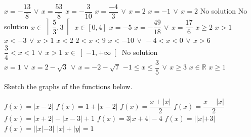 \begin{Answer}\phantom{}
    \begin{multicols}{2}
		
		\Question $x = -\dfrac{13}{8}\, \vee \, x = \dfrac{53}{8} $
		\Question $x = -\dfrac{3}{10}$
		\Question $x=\dfrac{-4}{3} \, \vee \, x = 2$ 
		\Question $x = -1 \, \vee \,  x = 2$
		\Question No solution
		\Question No solution
		\Question $x \in \left]\dfrac{5}{3},3 \right[$ 
	    \Question $x \in \left[0,4 \right]$
		\Question $x= -5$
		\Question $x = -\dfrac{49}{18}\, \vee \, x = \dfrac{17}{6} $
		\Question $x \geq 2$
		\Question $x>1$ 
		\Question $x<-3 \, \vee \, x>1$ 
		\Question $x<2$
		\Question $2 < x < 9$
		\Question $x < -10 \, \vee \, -4 < x < 0 \, \vee \, x >6$
		\Question $\dfrac{3}{4} < x < 1 \, \vee \, x >1$
		\Question $x \in \left]-1, +\infty \right[ $
		\Question No solution
		\Question $x= 1 \, \vee \, x=2-\sqrt{3} \, \vee \, x=-2 -\sqrt{7}$
		\Question $-1 \leq x \leq \dfrac{3}{5} \, \vee \,x \geq 3$
		\Question $x \in \mathbb{R}$
		\Question $x \geq 1 $
		\EndCurrentQuestion 
	\end{multicols}
\end{Answer}

\begin{Exercise} [label=oef_abs_waarde] Sketch the graphs of the functions below. 
	\begin{multicols}{2}
		\Question[difficulty = 1] $f(x)=|x-2|$
		\Question[difficulty = 1] $f(x)=1+|x-2|$
		\Question[difficulty = 1] $f(x)=\dfrac{x+|x|}{2}$ 
		\Question[difficulty = 1] $f(x)=\dfrac{x-|x|}{2}$ 
		\ifanalysis\Question[difficulty = 1]\fi \ifcalculus\Question[difficulty = 2]\fi $f(x)=|x+2| - |x-3|+1$  
		\ifanalysis\Question[difficulty = 1]\fi \ifcalculus\Question[difficulty = 2]\fi $f(x)=3|x+4|-4$ 
		\Question[difficulty = 2] $f(x)=||x|+3|$ 
		\Question[difficulty = 2] $f(x)=||x|-3|$ 
		\Question[difficulty = 2] $|x|+|y|=1$ %
        \EndCurrentQuestion
    \end{multicols}
\end{Exercise}

